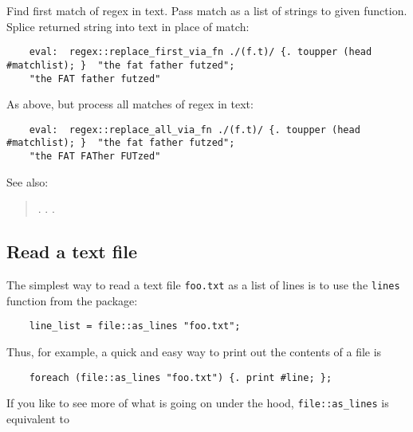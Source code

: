 Find first match of regex in text. 
Pass match as a list of strings to given function. 
Splice returned string into text in place of match:
\begin{verbatim}
    eval:  regex::replace_first_via_fn ./(f.t)/ {. toupper (head #matchlist); }  "the fat father futzed";
    "the FAT father futzed"
\end{verbatim}

As above, but process all matches of regex in text:
\begin{verbatim}
    eval:  regex::replace_all_via_fn ./(f.t)/ {. toupper (head #matchlist); }  "the fat father futzed";
    "the FAT FATher FUTzed"
\end{verbatim}

See also:
\begin{quotation}
.\newline 
{}.\newline 
{}.\newline
{}\newline
\end{quotation}
\cutend*


\subsection{Read a text file}

The simplest way to read a text file {\tt foo.txt} as a list of lines is 
to use the {\tt lines} function from the 
 package:

\begin{verbatim}
    line_list = file::as_lines "foo.txt";
\end{verbatim}

Thus, for example, a quick and easy way to print out the contents of a file is

\begin{verbatim}
    foreach (file::as_lines "foo.txt") {. print #line; };
\end{verbatim}

If you like to see more of what is going on under the hood, {\tt file::as\_lines} 
is equivalent to

